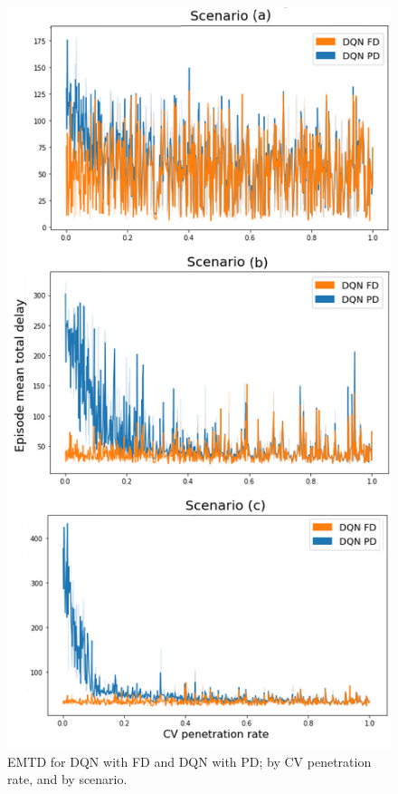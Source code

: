 \documentclass[journal]{IEEEtran}
\begin{document}
\begin{figure}[htbp]
  \begin{center}
    \includegraphics[width=0.9\linewidth,keepaspectratio]{img/results/pd_1.png}  
    \caption{EMTD for DQN with FD and DQN with PD; by CV penetration rate, and by scenario.}
    \label{fig:pd_1}
  \end{center}
\end{figure}
\end{document}
